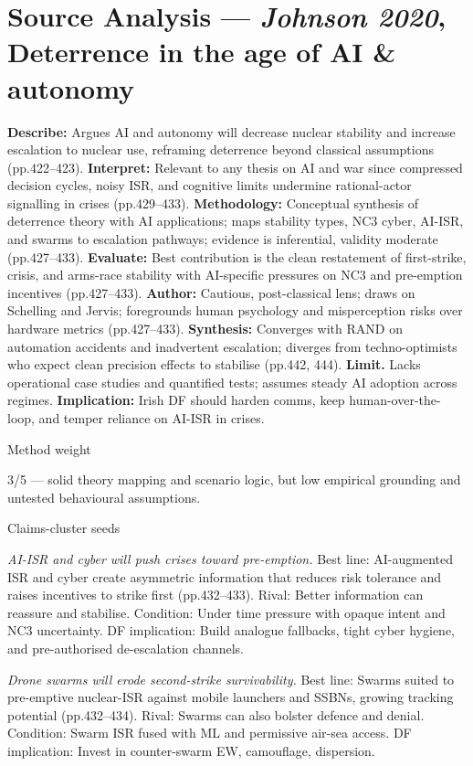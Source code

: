 \section*{Source Analysis — \textit{Johnson 2020}, Deterrence in the age of AI & autonomy}
\textbf{Describe:} Argues AI and autonomy will decrease nuclear stability and increase escalation to nuclear use, reframing deterrence beyond classical assumptions (pp.422–423).
\textbf{Interpret:} Relevant to any thesis on AI and war since compressed decision cycles, noisy ISR, and cognitive limits undermine rational-actor signalling in crises (pp.429–433).
\textbf{Methodology:} Conceptual synthesis of deterrence theory with AI applications; maps stability types, NC3 cyber, AI-ISR, and swarms to escalation pathways; evidence is inferential, validity moderate (pp.427–433).
\textbf{Evaluate:} Best contribution is the clean restatement of first-strike, crisis, and arms-race stability with AI-specific pressures on NC3 and pre-emption incentives (pp.427–433).
\textbf{Author:} Cautious, post-classical lens; draws on Schelling and Jervis; foregrounds human psychology and misperception risks over hardware metrics (pp.427–433).
\textbf{Synthesis:} Converges with RAND on automation accidents and inadvertent escalation; diverges from techno-optimists who expect clean precision effects to stabilise (pp.442, 444).
\textbf{Limit.} Lacks operational case studies and quantified tests; assumes steady AI adoption across regimes.
\textbf{Implication:} Irish DF should harden comms, keep human-over-the-loop, and temper reliance on AI-ISR in crises.

Method weight

3/5 — solid theory mapping and scenario logic, but low empirical grounding and untested behavioural assumptions.

Claims-cluster seeds

\textit{AI-ISR and cyber will push crises toward pre-emption.} Best line: AI-augmented ISR and cyber create asymmetric information that reduces risk tolerance and raises incentives to strike first (pp.432–433). Rival: Better information can reassure and stabilise. Condition: Under time pressure with opaque intent and NC3 uncertainty. DF implication: Build analogue fallbacks, tight cyber hygiene, and pre-authorised de-escalation channels.

\textit{Drone swarms will erode second-strike survivability.} Best line: Swarms suited to pre-emptive nuclear-ISR against mobile launchers and SSBNs, growing tracking potential (pp.432–434). Rival: Swarms can also bolster defence and denial. Condition: Swarm ISR fused with ML and permissive air-sea access. DF implication: Invest in counter-swarm EW, camouflage, dispersion.

